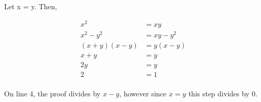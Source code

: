 
Let x = y. Then,

\begin{align}
  x^2        & = xy       \\
  x^2 - y^2  & = xy - y^2 \\
  (x+y)(x-y) & = y(x-y)   \\
  x + y      & = y        \\
  2y         & = y        \\
  2          & = 1        \\
\end{align}

\Ans On line 4, the proof divides by $x - y$, however since $x = y$ this step divides by $0$.
